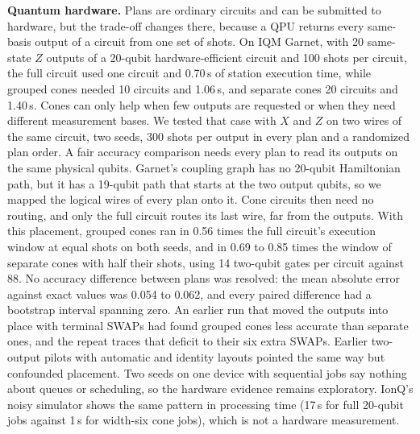 \textbf{Quantum hardware.} Plans are ordinary circuits and can be submitted to hardware, but the trade-off changes there, because a QPU returns every same-basis output of a circuit from one set of shots. On IQM Garnet, with 20 same-state $Z$ outputs of a 20-qubit hardware-efficient circuit and 100 shots per circuit, the full circuit used one circuit and 0.70\,s of station execution time, while grouped cones needed 10 circuits and 1.06\,s, and separate cones 20 circuits and 1.40\,s. Cones can only help when few outputs are requested or when they need different measurement bases. We tested that case with $X$ and $Z$ on two wires of the same circuit, two seeds, 300 shots per output in every plan and a randomized plan order. A fair accuracy comparison needs every plan to read its outputs on the same physical qubits. Garnet's coupling graph has no 20-qubit Hamiltonian path, but it has a 19-qubit path that starts at the two output qubits, so we mapped the logical wires of every plan onto it. Cone circuits then need no routing, and only the full circuit routes its last wire, far from the outputs. With this placement, grouped cones ran in 0.56 times the full circuit's execution window at equal shots on both seeds, and in 0.69 to 0.85 times the window of separate cones with half their shots, using 14 two-qubit gates per circuit against 88. No accuracy difference between plans was resolved: the mean absolute error against exact values was 0.054 to 0.062, and every paired difference had a bootstrap interval spanning zero. An earlier run that moved the outputs into place with terminal SWAPs had found grouped cones less accurate than separate ones, and the repeat traces that deficit to their six extra SWAPs. Earlier two-output pilots with automatic and identity layouts pointed the same way but confounded placement. Two seeds on one device with sequential jobs say nothing about queues or scheduling, so the hardware evidence remains exploratory. IonQ's noisy simulator shows the same pattern in processing time (17\,s for full 20-qubit jobs against 1\,s for width-six cone jobs), which is not a hardware measurement.

\begin{table}[!t]
\caption{Trained Classifiers on One CPU Thread: Median Time over Direct Qulacs. Iris Rows Time Complete 30-Step Training Runs, Replayed Rows Time Inference Batches of 64 Examples Including Setup. F and G Denote the Full and Grouped Plans Chosen by \texttt{auto}.}
\label{tab:trained}
\centering
\setlength{\tabcolsep}{3pt}
\footnotesize
\resizebox{\columnwidth}{!}{}
\end{table}

